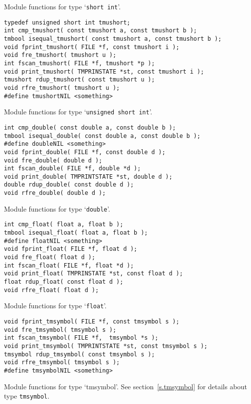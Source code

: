 \begin{desc}
Module functions for type `\texttt{short int}'.
\end{desc}
\begin{verbatim}
typedef unsigned short int tmushort;
int cmp_tmushort( const tmushort a, const tmushort b );
tmbool isequal_tmushort( const tmushort a, const tmushort b );
void fprint_tmushort( FILE *f, const tmushort i );
void fre_tmushort( tmushort u );
int fscan_tmushort( FILE *f, tmushort *p );
void print_tmushort( TMPRINSTATE *st, const tmushort i );
tmushort rdup_tmushort( const tmushort u );
void rfre_tmushort( tmushort u );
#define tmushortNIL <something>
\end{verbatim}
\begin{desc}
Module functions for type `\texttt{unsigned short int}'.
\end{desc}
\begin{verbatim}
int cmp_double( const double a, const double b );
tmbool isequal_double( const double a, const double b );
#define doubleNIL <something>
void fprint_double( FILE *f, const double d );
void fre_double( double d );
int fscan_double( FILE *f, double *d );
void print_double( TMPRINTSTATE *st, double d );
double rdup_double( const double d );
void rfre_double( double d );
\end{verbatim}
\begin{desc}
Module functions for type `\texttt{double}'.
\end{desc}
\begin{verbatim}
int cmp_float( float a, float b );
tmbool isequal_float( float a, float b );
#define floatNIL <something>
void fprint_float( FILE *f, float d );
void fre_float( float d );
int fscan_float( FILE *f, float *d );
void print_float( TMPRINSTATE *st, const float d );
float rdup_float( const float d );
void rfre_float( float d );
\end{verbatim}
\begin{desc}
Module functions for type `\texttt{float}'.
\end{desc}
\begin{verbatim}
void fprint_tmsymbol( FILE *f, const tmsymbol s );
void fre_tmsymbol( tmsymbol s );
int fscan_tmsymbol( FILE *f,  tmsymbol *s );
void print_tmsymbol( TMPRINTSTATE *st, const tmsymbol s );
tmsymbol rdup_tmsymbol( const tmsymbol s );
void rfre_tmsymbol( tmsymbol s );
#define tmsymbolNIL <something>
\end{verbatim}
\begin{desc}
Module functions for type `tmsymbol'.
See section~\ref{s.tmsymbol} for details about type \verb"tmsymbol".
\end{desc}

